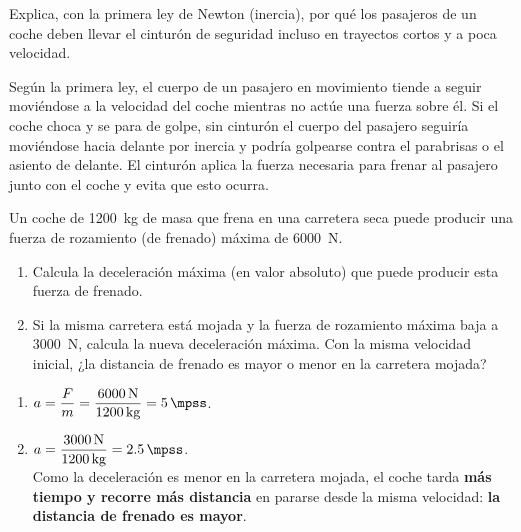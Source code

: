 \begin{exercise}
    Explica, con la primera ley de Newton (inercia), por qué los pasajeros de un coche deben llevar el cinturón de seguridad incluso en trayectos cortos y a poca velocidad.
    \begin{solu}
        Según la primera ley, el cuerpo de un pasajero en movimiento tiende a seguir moviéndose a la velocidad del coche mientras no actúe una fuerza sobre él. Si el coche choca y se para de golpe, sin cinturón el cuerpo del pasajero seguiría moviéndose hacia delante por inercia y podría golpearse contra el parabrisas o el asiento de delante. El cinturón aplica la fuerza necesaria para frenar al pasajero junto con el coche y evita que esto ocurra.
    \end{solu}
\end{exercise}

\begin{exercise}
    Un coche de \qty{1200}{\kg} de masa que frena en una carretera seca puede producir una fuerza de rozamiento (de frenado) máxima de \qty{6000}{\newton}.
    \begin{enumerate}[label=\letraminuscula]
        \item Calcula la deceleración máxima (en valor absoluto) que puede producir esta fuerza de frenado.
        \item Si la misma carretera está mojada y la fuerza de rozamiento máxima baja a \qty{3000}{\newton}, calcula la nueva deceleración máxima. Con la misma velocidad inicial, ¿la distancia de frenado es mayor o menor en la carretera mojada?
    \end{enumerate}
    \begin{solu}
        \begin{enumerate}[label=\alph*)]
            \item \(a = \dfrac{F}{m} = \dfrac{\qty{6000}{\newton}}{\qty{1200}{\kg}} = \qty{5}{\mpss}\).
            \item \(a = \dfrac{\qty{3000}{\newton}}{\qty{1200}{\kg}} = \qty{2.5}{\mpss}\). \\
            Como la deceleración es menor en la carretera mojada, el coche tarda \textbf{más tiempo y recorre más distancia} en pararse desde la misma velocidad: \textbf{la distancia de frenado es mayor}.
        \end{enumerate}
    \end{solu}
\end{exercise}

